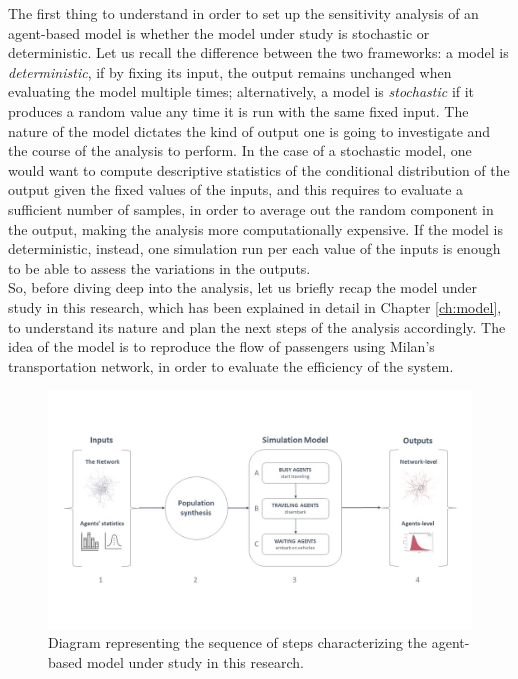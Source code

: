 The first thing to understand in order to set up the sensitivity analysis of an agent-based model is whether the model under study is stochastic or deterministic. Let us recall the difference between the two frameworks: a model is \textit{deterministic}, if by fixing its input, the output remains unchanged when evaluating the model multiple times; alternatively, a model is \textit{stochastic} if it produces a random value any time it is run with the same fixed input. The nature of the model dictates the kind of output one is going to investigate and the course of the analysis to perform. In the case of a stochastic model, one would want to compute descriptive statistics of the conditional distribution of the output given the fixed values of the inputs, and this requires to evaluate a sufficient number of samples, in order to average out the random component in the output, making the analysis more computationally expensive. If the model is deterministic, instead, one simulation run per each value of the inputs is enough to be able to assess the variations in the outputs. \\ So, before diving deep into the analysis, let us briefly recap the model under study in this research, which has been explained in detail in Chapter \ref{ch:model}, to understand its nature and plan the next steps of the analysis accordingly. The idea of the model is to reproduce the flow of passengers using Milan's transportation network, in order to evaluate the efficiency of the system.
\begin{figure}
    \centering
    \includegraphics[width = \textwidth]{tex/pics/model_ppt2.jpg}
    \caption{Diagram representing the sequence of steps characterizing the agent-based model under study in this research.}
    \label{fig:model_schema}
\end{figure}
